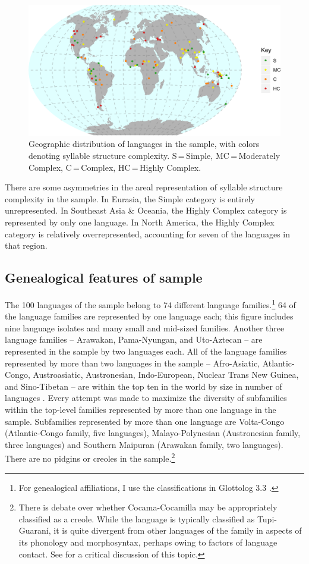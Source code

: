 \begin{figure}
\includegraphics[width=\textwidth]{figures/fig21.png}
\caption{\label{fig:2.1}Geographic distribution of languages in the sample, with colors denoting syllable structure complexity. S\,=\,Simple, MC\,=\,Moderately Complex, C\,=\,Complex, HC\,=\,Highly Complex.}
\end{figure}

  There are some asymmetries in the areal representation of syllable structure complexity in the sample. In Eurasia, the Simple category is entirely unrepresented. In Southeast Asia \& Oceania, the Highly Complex category is represented by only one language. In North America, the Highly Complex category is relatively overrepresented, accounting for seven of the languages in that region.

\subsection{Genealogical features of sample}\label{sec:2.4.2}

  The 100 languages of the sample belong to 74 different language families.\footnote{{For genealogical affiliations, I use the classifications in Glottolog 3.3 \citep{HammarströmEtAl2018}.}} 64 of the language families are represented by one language each; this figure includes nine language isolates and many small and mid-sized families. Another three language families -- Arawakan, Pama-Nyungan, and Uto-Aztecan -- are represented in the sample by two languages each. All of the language families represented by more than two languages in the sample -- Afro-Asiatic, Atlantic-Congo, Austroasiatic, Austronesian, Indo-European, Nuclear Trans New Guinea, and Sino-Tibetan -- are within the top ten in the world by size in number of languages \citep{HammarströmEtAl2018}. Every attempt was made to maximize the diversity of subfamilies within the top-level families represented by more than one language in the sample. Subfamilies represented by more than one language are Volta-Congo (Atlantic-Congo family, five languages), Malayo-Polynesian (Austronesian family, three languages) and Southern Maipuran (Arawakan family, two languages). There are no pidgins or creoles in the sample.\footnote{{There is debate over whether Cocama-Cocamilla may be appropriately classified as a creole. While the language is typically classified as Tupi-Guaraní, it is quite divergent from other languages of the family in aspects of its phonology and morphosyntax, perhaps owing to factors of language contact. See  \citet{VallejosYopán2010} for a critical discussion of this topic.}}

